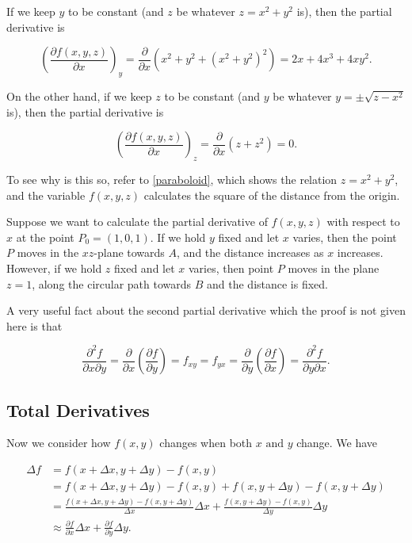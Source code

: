 \documentclass[english,a4paper,12pt]{report}
\begin{document}
If we keep \(y\) to be constant (and \(z\) be whatever \(z = x^2+y^2\) is), then the partial derivative is 

\begin{equation}
	\left( \frac{\partial f(x,y,z)}{\partial x}  \right)_{y} = \frac{\partial }{\partial x} (x^2+y^2+(x^2+y^2)^2) = 2x+4x^3 +4xy^2.  
\end{equation}

On the other hand, if we keep \(z\) to be constant (and \(y\) be whatever \(y = \pm \sqrt{z-x^2} \) is), then the partial derivative is 

\begin{equation}
	\left( \frac{\partial f(x,y,z)}{\partial x}  \right)_{z} = \frac{\partial }{\partial x} (z+z^2) = 0. 
\end{equation}

To see why is this so, refer to \cref{paraboloid}, which shows the relation \(z = x^2+y^2\), and the variable \(f(x,y,z)\) calculates the square of the distance from the origin. 

Suppose we want to calculate the partial derivative of \(f(x,y,z)\) with respect to \(x\) at the point \(P_0 = (1,0,1)\). If we hold \(y\) fixed and let \(x\) varies, then the point \(P\) moves in the \(xz\)-plane towards \(A\), and the distance increases as \(x\) increases. However, if we hold \(z\) fixed and let \(x\) varies, then point \(P\) moves in the plane \(z = 1\), along the circular path towards \(B\) and the distance is fixed.   


A very useful fact about the second partial derivative which the proof is not given here is that 

\begin{equation}
    \frac{\partial^2 f}{\partial x \partial y} = \frac{\partial }{\partial x} \left( \frac{\partial f}{\partial y}  \right) = f_{xy} = f_{yx} = \frac{\partial }{\partial y} \left( \frac{\partial f}{\partial x}  \right) = \frac{\partial^2 f}{\partial y \partial x}.     
\end{equation}

\subsection{Total Derivatives}

Now we consider how \(f(x,y)\) changes when both \(x \text { and } y\) change. We have

\begin{equation} \label{totaldf} 
    \begin{aligned}
        \Delta f &= f(x+\Delta x,y+\Delta y) - f(x,y) \\
        &= f(x+\Delta x,y+\Delta y) - f(x,y) + f(x,y+\Delta y) - f(x,y+\Delta y) \\
        &= \frac{f(x+\Delta x,y+\Delta y)-f(x,y+\Delta y)}{\Delta x}\Delta x + \frac{f(x,y+\Delta y)-f(x,y)}{\Delta y} \Delta y \\
        &\approx \frac{\partial f}{\partial x} \Delta x + \frac{\partial f}{\partial y} \Delta y. 
    \end{aligned}
\end{equation}
\end{document}
